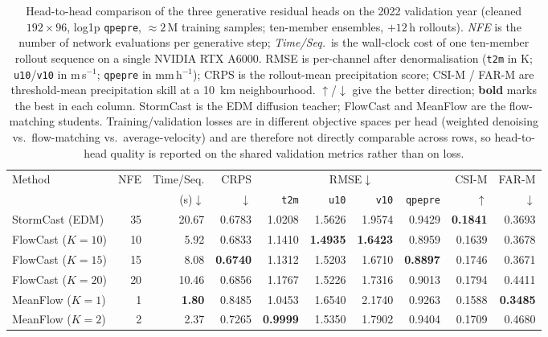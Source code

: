 \begin{table}[htbp]
  \centering
  \caption[Methods comparison: StormCast vs FlowCast vs MeanFlow]{Head-to-head
  comparison of the three generative residual heads on the 2022 validation year
  (cleaned $192\times96$, log1p \texttt{qpepre}, $\approx 2\,\text{M}$ training
  samples; ten-member ensembles, $+12$\,h rollouts). \emph{NFE} is the number of
  network evaluations per generative step; \emph{Time/Seq.}\ is the wall-clock
  cost of one ten-member rollout sequence on a single NVIDIA RTX A6000. RMSE is
  per-channel after denormalisation (\texttt{t2m} in K; \texttt{u10}/\texttt{v10}
  in m\,s$^{-1}$; \texttt{qpepre} in mm\,h$^{-1}$); CRPS is the rollout-mean
  precipitation score; CSI-M / FAR-M are threshold-mean precipitation skill at a
  \SI{10}{\kilo\metre} neighbourhood. $\uparrow$/$\downarrow$ give the better
  direction; \textbf{bold} marks the best in each column. StormCast is the EDM
  diffusion teacher; FlowCast and MeanFlow are the flow-matching students.
  Training/validation losses are in different objective spaces per head (weighted
  denoising vs.\ flow-matching vs.\ average-velocity) and are therefore not
  directly comparable across rows, so head-to-head quality is reported on the
  shared validation metrics rather than on loss.}
  \label{tab:method-compare}
  \small
  \setlength{\tabcolsep}{4pt}
  \begin{tabular}{lrrrrrrrrr}
    \toprule
    Method & NFE & Time/Seq. & CRPS & \multicolumn{4}{c}{RMSE$\downarrow$} & CSI-M & FAR-M \\
    \cmidrule(lr){5-8}
     & & (s)$\downarrow$ & $\downarrow$ & \texttt{t2m} & \texttt{u10} & \texttt{v10} & \texttt{qpepre} & $\uparrow$ & $\downarrow$ \\
    \midrule
    StormCast (EDM)     & 35 & 20.67 & 0.6783 & 1.0208 & 1.5626 & 1.9574 & 0.9429 & \textbf{0.1841} & 0.3693 \\
    \midrule
    FlowCast ($K{=}10$) & 10 & 5.92 & 0.6833 & 1.1410 & \textbf{1.4935} & \textbf{1.6423} & 0.8959 & 0.1639 & 0.3678 \\
    FlowCast ($K{=}15$) & 15 & 8.08 & \textbf{0.6740} & 1.1312 & 1.5203 & 1.6710 & \textbf{0.8897} & 0.1746 & 0.3671 \\
    FlowCast ($K{=}20$) & 20 & 10.46 & 0.6856 & 1.1767 & 1.5226 & 1.7316 & 0.9013 & 0.1794 & 0.4411 \\
    \midrule
    MeanFlow ($K{=}1$)  & 1 & \textbf{1.80} & 0.8485 & 1.0453 & 1.6540 & 2.1740 & 0.9263 & 0.1588 & \textbf{0.3485} \\
    MeanFlow ($K{=}2$)  & 2 & 2.37 & 0.7265 & \textbf{0.9999} & 1.5350 & 1.7902 & 0.9404 & 0.1709 & 0.4680 \\
    \bottomrule
  \end{tabular}
\end{table}
